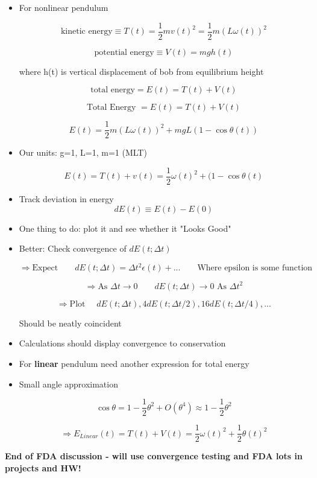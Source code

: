 \begin{itemize}

    \item For nonlinear pendulum

        \[ \text{kinetic energy} \equiv T(t) = \frac{1}{2} mv(t)^2 = \frac{1}{2} m (L \omega (t))^2\]

        \[ \text{potential energy} \equiv V(t) = mgh(t)\]

        where h(t) is vertical displacement of bob from equilibrium height

        \[ \text{total energy} = E(t) = T(t) + V(t)\]

        
    \[ \text{Total Energy } = E(t) = T(t) + V(t) \]

    \[ E(t) = \frac{1}{2} m (L\omega(t))^2 + mgL(1-\cos\theta(t))\]

    
    \item Our units: g=1, L=1, m=1 (MLT)

    \[ E(t) = T(t) + v(t) = \frac{1}{2} \omega (t)^2 + (1-\cos\theta(t)\]

    \item Track deviation in energy 
    \[ dE(t) \equiv E(t)-E(0)\]

    \item One thing to do: plot it and see whether it "Looks Good"

    \item Better: Check convergence of $dE(t;\Delta t)$

    \[ \Rightarrow \text{Expect} \qquad dE(t; \Delta t) = \Delta t^2 \epsilon(t) + ... \qquad \text{Where epsilon is some function}\]

    \[ \Rightarrow \text{As } \Delta t \rightarrow 0 \qquad dE(t;\Delta t) \rightarrow 0 \text{ As } \Delta t^2\]

    \[ \Rightarrow \text{Plot } \quad dE(t; \Delta t), 4dE(t; \Delta t/2), 16 dE(t; \Delta t/4), ...\]

    Should be neatly coincident

    \item Calculations should display convergence to conservation

    \item For \textbf{linear} pendulum need another expression for total energy
    \item Small angle approximation

    \[ \cos\theta = 1 - \frac{1}{2} \theta ^2 + O(\theta^4) \approx 1- \frac{1}{2}\theta^2\]

    \[ \Rightarrow E_{Linear}(t) = T(t) + V(t) = \frac{1}{2}\omega(t)^2 + \frac{1}{2} \theta (t)^2\]
    
\end{itemize}

\textbf{End of FDA discussion - will use convergence testing and FDA lots in projects and HW!}
